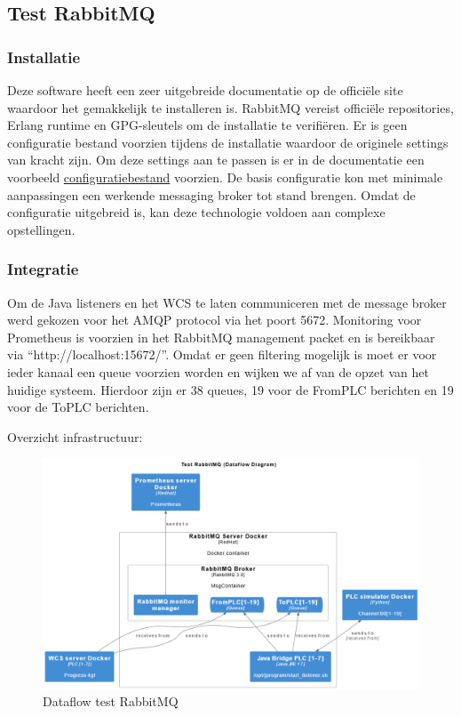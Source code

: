 \subsection{Test RabbitMQ}

\subsubsection{Installatie}
Deze software heeft een zeer uitgebreide documentatie op de officiële site waardoor het gemakkelijk te installeren is.
RabbitMQ vereist officiële repositories, Erlang runtime en GPG-sleutels om de installatie te verifiëren.
Er is geen configuratie bestand voorzien tijdens de installatie waardoor de originele settings van kracht zijn.
Om deze settings aan te passen is er in de documentatie een voorbeeld \hyperref[sec:config_rabbitmq]{configuratiebestand} voorzien.
De basis configuratie kon met minimale aanpassingen een werkende messaging broker tot stand brengen.
Omdat de configuratie uitgebreid is, kan deze technologie voldoen aan complexe opstellingen.

\subsubsection{Integratie}
Om de Java listeners en het WCS te laten communiceren met de message broker werd gekozen voor het AMQP protocol via het poort 5672.
Monitoring voor Prometheus is voorzien in het RabbitMQ management packet en is bereikbaar via ``http://localhost:15672/''.
Omdat er geen filtering mogelijk is moet er voor ieder kanaal een queue voorzien worden en wijken we af van de opzet van het huidige systeem.
Hierdoor zijn er 38 queues, 19 voor de FromPLC berichten en 19 voor de ToPLC berichten.

Overzicht infrastructuur:
\begin{figure}[h!]
  \centering
  \includegraphics[width=.95\textwidth]{img/test-rabbitmq-dataflow.png}
  \caption{\label{fig:test_rabbitmq_dataflow}Dataflow test RabbitMQ}
\end{figure}

